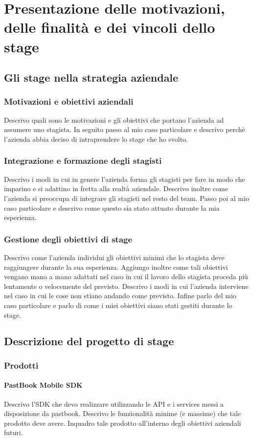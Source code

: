 \chapter{Presentazione delle motivazioni, delle finalità e dei vincoli dello stage}
	\section{Gli stage nella strategia aziendale}
		\subsection{Motivazioni e obiettivi aziendali}
			Descrivo quali sono le motivazioni e gli obiettivi che portano l'azienda ad assumere uno stagista. In seguito passo al mio
			caso particolare e descrivo perchè l'azienda abbia deciso di intraprendere lo stage che ho svolto.
		\subsection{Integrazione e formazione degli stagisti}
			Descrivo i modi in cui in genere l'azienda forma gli stagisti per fare in modo che imparino e si adattino in fretta alla
			realtà aziendale. Descrivo inoltre come l'azienda si preoccupa di integrare gli stagisti nel resto del team.
			Passo poi al mio caso particolare e descrivo come questo sia stato attuato durante la mia esperienza.
		\subsection{Gestione degli obiettivi di stage}
			Descrivo come l'azienda individui gli obiettivi minimi che lo stagista deve raggiungere durante la sua esperienza. Aggiungo
			inoltre come tali obiettivi vengano mano a mano adattati nel caso in cui il lavoro dello stagista proceda più lentamente o
			velocemente del previsto. Descrivo i modi in cui l'azienda interviene nel caso in cui le cose non stiano andando come
			previsto. Infine parlo del mio caso particolare e parlo di come i miei obiettivi siano stati gestiti durante lo stage.
	\section{Descrizione del progetto di stage}
		\subsection{Prodotti}
			\subsubsection{PastBook Mobile SDK}
				Descrivo l'SDK che devo realizzare utilizzando le API e i services messi a disposizione da pastbook. Descrivo le
				funzionalità minime (e massime) che tale prodotto deve avere. Inquadro tale prodotto all'interno degli obiettivi
				aziendali futuri.

